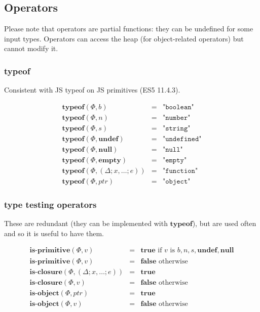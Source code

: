 \documentclass[draft, 10pt]{article}
\newcommand{\expr}[0]{e}
\newcommand{\var}[0]{x}
\newcommand{\bool}[0]{b}
\newcommand{\num}[0]{n}
\newcommand{\str}[0]{s}
\newcommand{\undef}[0]{\textbf{undef}}
\newcommand{\nul}[0]{\textbf{null}}
\newcommand{\empt}[0]{\textbf{empty}}
\newcommand{\true}[0]{\textbf{true}}
\newcommand{\false}[0]{\textbf{false}}
\newcommand{\optypeof}[0]{\textbf{typeof}}
\newcommand{\opisprim}[0]{\textbf{is-primitive}}
\newcommand{\opisclosure}[0]{\textbf{is-closure}}
\newcommand{\opisobject}[0]{\textbf{is-object}}
\newcommand{\varenv}[0]{\Delta}
\newcommand{\heap}[0]{\Phi}
\newcommand{\closure}[3]{(#1; #2; #3)}
\newcommand{\bigval}[0]{v}
\newcommand{\heapptr}{ptr}
\newcommand{\rununop}[3]{#1(#2,#3)}
\begin{document}
\subsection{Operators}

Please note that operators are partial functions: they can be
undefined for some input types. Operators can access the heap
(for object-related operators) but cannot modify it.

\subsubsection{typeof}

Consistent with JS typeof on JS primitives (ES5 11.4.3).

\[
\begin{array}{rcl}
\rununop{\optypeof}{\heap}{\bool} &=& \texttt{"boolean"} \\
\rununop{\optypeof}{\heap}{\num} &=& \texttt{"number"} \\
\rununop{\optypeof}{\heap}{\str} &=& \texttt{"string"} \\
\rununop{\optypeof}{\heap}{\undef} &=& \texttt{"undefined"} \\
\rununop{\optypeof}{\heap}{\nul} &=& \texttt{"null"} \\
\rununop{\optypeof}{\heap}{\empt} &=& \texttt{"empty"} \\
\rununop{\optypeof}{\heap}{\closure{\varenv}{\var, \dots}{\expr}} &=& \texttt{"function"} \\
\rununop{\optypeof}{\heap}{\heapptr} &=& \texttt{"object"} 
\end{array}
\]

\subsubsection{type testing operators}

These are redundant (they can be implemented with $\optypeof$), 
but are used often and so it is useful to have them.

\[
\begin{array}{rcl}
\rununop{\opisprim}{\heap}{\bigval} &=& \true \textrm{ if $\bigval$ is $\bool, \num, \str, \undef, \nul$} \\
\rununop{\opisprim}{\heap}{\bigval} &=& \false \textrm{ otherwise} \\
\rununop{\opisclosure}{\heap}{\closure{\varenv}{\var, \dots}{\expr}} &=& \true \\
\rununop{\opisclosure}{\heap}{\bigval} &=& \false \textrm{ otherwise} \\
\rununop{\opisobject}{\heap}{\heapptr} &=& \true \\
\rununop{\opisobject}{\heap}{\bigval} &=& \false \textrm{ otherwise} 
\end{array}
\]
\end{document}
